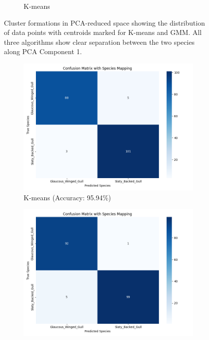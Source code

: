 \documentclass[a4paper,12pt]{report}
\begin{document}
\begin{figure}[H]
\begin{subfigure}[b]{0.32\textwidth}
        \caption{K-means}
        \label{fig:kmeans_cluster}
    \end{subfigure}
    \caption{Cluster formations in PCA-reduced space showing the distribution of data points with centroids marked for K-means and GMM. All three algorithms show clear separation between the two species along PCA Component 1.}
    \label{fig:cluster_visualizations}
\end{figure}

\begin{figure}[H]
    \centering
    \begin{subfigure}[b]{0.32\textwidth}
        \centering
        \includegraphics[width=\textwidth]{images/clustering/kmeans_confusion_matrix.png}
        \caption{K-means (Accuracy: 95.94\%)}
        \label{fig:kmeans_cm}
    \end{subfigure}
    \hfill
    \begin{subfigure}[b]{0.32\textwidth}
        \centering
        \includegraphics[width=\textwidth]{images/clustering/hierarchical_confusion_matrix.png}

\end{subfigure}
\end{figure}
\end{document}
